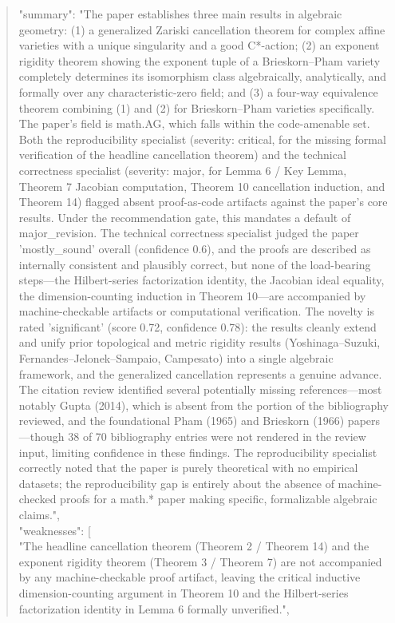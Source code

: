 \documentclass[11pt]{article}
\begin{document}
\begin{quote}
  "summary": "The paper establishes three main results in algebraic geometry: (1) a generalized Zariski cancellation theorem for complex affine varieties with a unique singularity and a good C*-action; (2) an exponent rigidity theorem showing the exponent tuple of a Brieskorn--Pham variety completely determines its isomorphism class algebraically, analytically, and formally over any characteristic-zero field; and (3) a four-way equivalence theorem combining (1) and (2) for Brieskorn--Pham varieties specifically. The paper's field is math.AG, which falls within the code-amenable set. Both the reproducibility specialist (severity: critical, for the missing formal verification of the headline cancellation theorem) and the technical correctness specialist (severity: major, for Lemma 6 / Key Lemma, Theorem 7 Jacobian computation, Theorem 10 cancellation induction, and Theorem 14) flagged absent proof-as-code artifacts against the paper's core results. Under the recommendation gate, this mandates a default of major\_revision. The technical correctness specialist judged the paper 'mostly\_sound' overall (confidence 0.6), and the proofs are described as internally consistent and plausibly correct, but none of the load-bearing steps---the Hilbert-series factorization identity, the Jacobian ideal equality, the dimension-counting induction in Theorem 10---are accompanied by machine-checkable artifacts or computational verification. The novelty is rated 'significant' (score 0.72, confidence 0.78): the results cleanly extend and unify prior topological and metric rigidity results (Yoshinaga--Suzuki, Fernandes--Jelonek--Sampaio, Campesato) into a single algebraic framework, and the generalized cancellation represents a genuine advance. The citation review identified several potentially missing references---most notably Gupta (2014), which is absent from the portion of the bibliography reviewed, and the foundational Pham (1965) and Brieskorn (1966) papers---though 38 of 70 bibliography entries were not rendered in the review input, limiting confidence in these findings. The reproducibility specialist correctly noted that the paper is purely theoretical with no empirical datasets; the reproducibility gap is entirely about the absence of machine-checked proofs for a math.* paper making specific, formalizable algebraic claims.",\\
  "weaknesses": [\\
    "The headline cancellation theorem (Theorem 2 / Theorem 14) and the exponent rigidity theorem (Theorem 3 / Theorem 7) are not accompanied by any machine-checkable proof artifact, leaving the critical inductive dimension-counting argument in Theorem 10 and the Hilbert-series factorization identity in Lemma 6 formally unverified.",\\

\end{quote}
\end{document}

